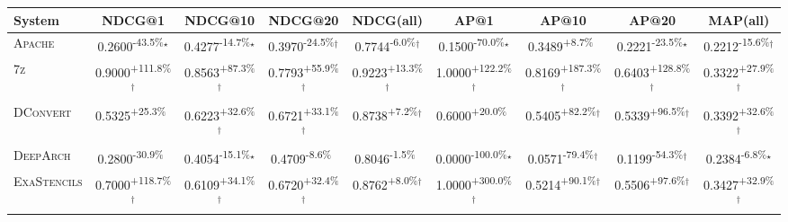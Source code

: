 \begin{table}[htbp]
\centering
\renewcommand{\arraystretch}{1.2}
\begin{tabular}{l|cccc|cccc}
\hline
System & NDCG@1 & NDCG@10 & NDCG@20 & NDCG(all) & AP@1 & AP@10 & AP@20 & MAP(all) \\ \hline
\textsc{Apache} & \cellcolor{red!30}0.2600\textsuperscript{-43.5\%}$^\star$ & \cellcolor{red!30}0.4277\textsuperscript{-14.7\%}$^\star$ & \cellcolor{red!30}0.3970\textsuperscript{-24.5\%}$^\dagger$ & \cellcolor{red!30}0.7744\textsuperscript{-6.0\%}$^\dagger$ & \cellcolor{red!30}0.1500\textsuperscript{-70.0\%}$^\star$ & \cellcolor{green!30}0.3489\textsuperscript{+8.7\%}$^{\,\,\,}$ & \cellcolor{red!30}0.2221\textsuperscript{-23.5\%}$^\star$ & \cellcolor{red!30}0.2212\textsuperscript{-15.6\%}$^\dagger$ \\
\textsc{7z} & \cellcolor{green!30}0.9000\textsuperscript{+111.8\%}$^\dagger$ & \cellcolor{green!30}0.8563\textsuperscript{+87.3\%}$^\dagger$ & \cellcolor{green!30}0.7793\textsuperscript{+55.9\%}$^\dagger$ & \cellcolor{green!30}0.9223\textsuperscript{+13.3\%}$^\dagger$ & \cellcolor{green!30}1.0000\textsuperscript{+122.2\%}$^\dagger$ & \cellcolor{green!30}0.8169\textsuperscript{+187.3\%}$^\dagger$ & \cellcolor{green!30}0.6403\textsuperscript{+128.8\%}$^\dagger$ & \cellcolor{green!30}0.3322\textsuperscript{+27.9\%}$^\dagger$ \\
\textsc{DConvert} & \cellcolor{green!30}0.5325\textsuperscript{+25.3\%}$^{\,\,\,}$ & \cellcolor{green!30}0.6223\textsuperscript{+32.6\%}$^\dagger$ & \cellcolor{green!30}0.6721\textsuperscript{+33.1\%}$^\dagger$ & \cellcolor{green!30}0.8738\textsuperscript{+7.2\%}$^\dagger$ & \cellcolor{green!30}0.6000\textsuperscript{+20.0\%}$^{\,\,\,}$ & \cellcolor{green!30}0.5405\textsuperscript{+82.2\%}$^\dagger$ & \cellcolor{green!30}0.5339\textsuperscript{+96.5\%}$^\dagger$ & \cellcolor{green!30}0.3392\textsuperscript{+32.6\%}$^\dagger$ \\
\textsc{DeepArch} & \cellcolor{red!30}0.2800\textsuperscript{-30.9\%}$^{\,\,\,}$ & \cellcolor{red!30}0.4054\textsuperscript{-15.1\%}$^\star$ & \cellcolor{red!30}0.4709\textsuperscript{-8.6\%}$^{\,\,\,}$ & \cellcolor{red!30}0.8046\textsuperscript{-1.5\%}$^{\,\,\,}$ & \cellcolor{red!30}0.0000\textsuperscript{-100.0\%}$^\star$ & \cellcolor{red!30}0.0571\textsuperscript{-79.4\%}$^\dagger$ & \cellcolor{red!30}0.1199\textsuperscript{-54.3\%}$^\dagger$ & \cellcolor{red!30}0.2384\textsuperscript{-6.8\%}$^\star$ \\
\textsc{ExaStencils} & \cellcolor{green!30}0.7000\textsuperscript{+118.7\%}$^\dagger$ & \cellcolor{green!30}0.6109\textsuperscript{+34.1\%}$^\dagger$ & \cellcolor{green!30}0.6720\textsuperscript{+32.4\%}$^\dagger$ & \cellcolor{green!30}0.8762\textsuperscript{+8.0\%}$^\dagger$ & \cellcolor{green!30}1.0000\textsuperscript{+300.0\%}$^\dagger$ & \cellcolor{green!30}0.5214\textsuperscript{+90.1\%}$^\dagger$ & \cellcolor{green!30}0.5506\textsuperscript{+97.6\%}$^\dagger$ & \cellcolor{green!30}0.3427\textsuperscript{+32.9\%}$^\dagger$ \\

\end{tabular}
\end{table}
